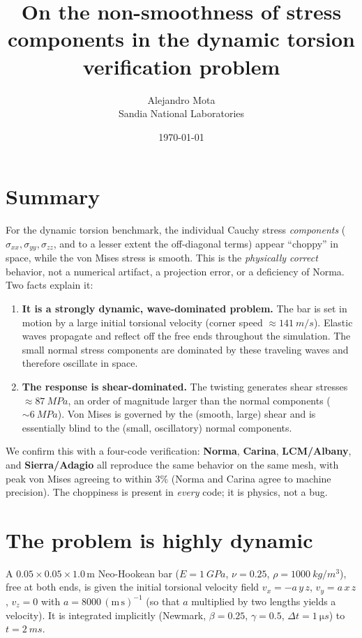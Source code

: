 \documentclass[11pt]{article}
\title{\vspace{-2em}On the non-smoothness of stress components in the dynamic
torsion verification problem}
\author{Alejandro Mota \\ \small Sandia National Laboratories}
\date{\today}
\newcommand{\sib}[1]{\,\mathrm{#1}}
\begin{document}
\maketitle
\vspace{-1.5em}

\section*{Summary}
For the dynamic torsion benchmark, the individual Cauchy stress
\emph{components} ($\sigma_{xx},\sigma_{yy},\sigma_{zz}$, and to a lesser extent
the off-diagonal terms) appear ``choppy'' in space, while the von Mises stress
is smooth. This is the \emph{physically correct} behavior, not a numerical
artifact, a projection error, or a deficiency of Norma. Two facts explain it:

\begin{enumerate}\itemsep2pt
  \item \textbf{It is a strongly dynamic, wave-dominated problem.} The bar is
  set in motion by a large initial torsional velocity (corner speed
  $\approx \SI{141}{m/s}$). Elastic waves propagate and reflect off the free
  ends throughout the simulation. The small normal stress components are
  dominated by these traveling waves and therefore oscillate in space.
  \item \textbf{The response is shear-dominated.} The twisting generates shear
  stresses $\approx \SI{87}{MPa}$, an order of magnitude larger than the normal
  components ($\sim\SI{6}{MPa}$). Von Mises is governed by the (smooth, large)
  shear and is essentially blind to the (small, oscillatory) normal components.
\end{enumerate}

\noindent We confirm this with a four-code verification: \textbf{Norma},
\textbf{Carina}, \textbf{LCM/Albany}, and \textbf{Sierra/Adagio} all reproduce
the same behavior on the same mesh, with peak von Mises agreeing to within
$3\%$ (Norma and Carina agree to machine precision). The choppiness is present
in \emph{every} code; it is physics, not a bug.

\section{The problem is highly dynamic}
A $0.05\times0.05\times1.0\sib{m}$ Neo-Hookean bar ($E=\SI{1}{GPa}$, $\nu=0.25$,
$\rho=\SI{1000}{kg/m^3}$), free at both ends, is given the initial torsional
velocity field $v_x=-a\,y\,z$, $v_y=a\,x\,z$, $v_z=0$ with
$a=8000\sib{(m\,s)^{-1}}$ (so that $a$ multiplied by two lengths yields a
velocity). It is integrated implicitly (Newmark, $\beta=0.25$, $\gamma=0.5$,
$\Delta t=\SI{1}{\micro s}$) to $t=\SI{2}{ms}$.
\end{document}
